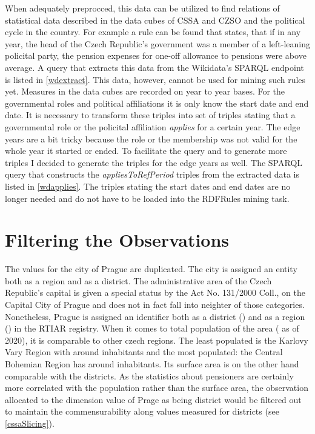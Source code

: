 When adequately preprocced, this data can be utilized to find relations of statistical data described in the data cubes of CSSA and CZSO and the political cycle in the country. For example a rule can be found that states, that if in any year, the head of the Czech Republic's government was a member of a left-leaning policital party, the pension expenses for one-off allowance to pensions were above average. A query that extracts this data from the Wikidata's SPARQL endpoint is listed in \ref{wdextract}. This data, however, cannot be used for mining such rules yet. Measures in the data cubes are recorded on year to year bases. For the governmental roles and political affiliations it is only know the start date and end date. It is necessary to transform these triples into set of triples stating that a governmental role or the policital affiliation \textit{applies} for a certain year. The edge years are a bit tricky because the role or the membership was not valid for the whole year it started or ended. To facilitate the query and to generate more triples I decided to generate the triples for the edge years as well. The SPARQL query that constructs the \textit{appliesToRefPeriod} triples from the extracted data is listed in \ref{wdapplies}. The triples stating the start dates and end dates are no longer needed and do not have to be loaded into the RDFRules mining task.



\section{Filtering the Observations}

The values for the city of Prague are duplicated. The city is assigned an entity both as a region and as a district. The administrative area of the Czech Republic's capital is given a special status by the Act No. 131/2000 Coll., on the Capital City of Prague and does not in fact fall into neighter of those categories. Nonetheless, Prague is assigned an identifier both as a district () and as a region () in the RTIAR registry. When it comes to total population of the area ( as of 2020), it is comparable to other czech regions. The least populated is the Karlovy Vary Region with around  inhabitants and the most populated: the Central Bohemian Region has around  inhabitants. Its surface area is on the other hand comparable with the districts. As the statistics about pensioners are certainly more correlated with the population rather than the surface area, the observation allocated to the dimension value of Prage as being district would be filtered out to maintain the commensurability along values measured for districts (see \ref{cssaSlicing}).

